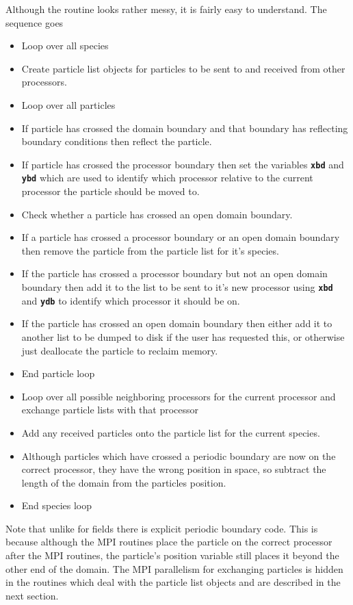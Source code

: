 \documentclass[12pt,a4paper]{article}
\newcommand{\inlinecode}[1]{{\color{warwickred} \bf\texttt{#1}}}
\begin{document}
Although the routine looks rather messy, it is fairly easy to understand. The
sequence goes
\begin{itemize}
\item Loop over all species
\item Create particle list objects for particles to be sent to and received from
  other processors.
\item Loop over all particles
\item If particle has crossed the domain boundary and that boundary has
  reflecting boundary conditions then reflect the particle.
\item If particle has crossed the processor boundary then set the variables
  \inlinecode{xbd} and \inlinecode{ybd} which are used to identify which
  processor relative to the current processor the particle should be moved to.
\item Check whether a particle has crossed an open domain boundary.
\item If a particle has crossed a processor boundary or an open domain boundary
  then remove the particle from the particle list for it's species.
\item If the particle has crossed a processor boundary but not an open domain
  boundary then add it to the list to be sent to it's new processor using
  \inlinecode{xbd} and \inlinecode{ydb} to identify which processor it should
  be on.
\item If the particle has crossed an open domain boundary then either add it to
  another list to be dumped to disk if the user has requested this, or
  otherwise just deallocate the particle to reclaim memory.
\item End particle loop
\item Loop over all possible neighboring processors for the current processor
  and exchange particle lists with that processor
\item Add any received particles onto the particle list for the current
  species.
\item Although particles which have crossed a periodic boundary are now on the
  correct processor, they have the wrong position in space, so subtract the
  length of the domain from the particles position.
\item End species loop
\end{itemize}

Note that unlike for fields there is explicit periodic boundary code. This is
because although the MPI routines place the particle on the correct processor
after the MPI routines, the particle's position variable still places it beyond
the other end of the domain. The MPI parallelism for exchanging particles is
hidden in the routines which deal with the particle list objects and are
described in the next section.
\pagebreak
\end{document}
